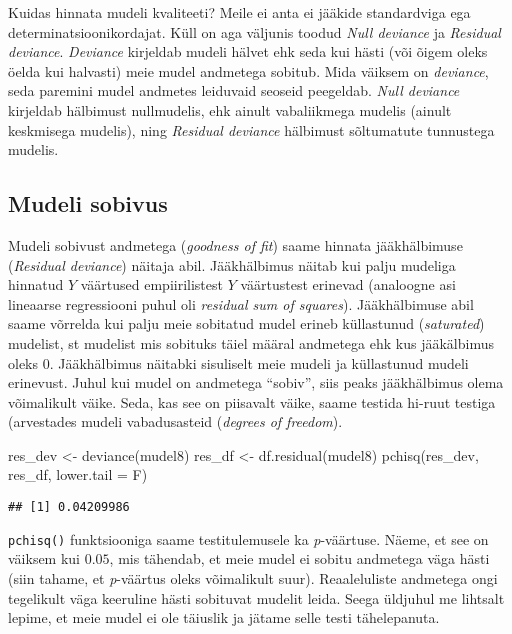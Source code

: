 \documentclass[
]{book}
\newenvironment{Shaded}{\begin{snugshade}}{\end{snugshade}}
\newcommand{\AttributeTok}[1]{\textcolor[rgb]{0.77,0.63,0.00}{#1}}
\newcommand{\FunctionTok}[1]{\textcolor[rgb]{0.00,0.00,0.00}{#1}}
\newcommand{\NormalTok}[1]{#1}
\newcommand{\OtherTok}[1]{\textcolor[rgb]{0.56,0.35,0.01}{#1}}
\begin{document}
Kuidas hinnata mudeli kvaliteeti? Meile ei anta ei jääkide standardviga ega determinatsioonikordajat. Küll on aga väljunis toodud \emph{Null deviance} ja \emph{Residual deviance}. \emph{Deviance} kirjeldab mudeli hälvet ehk seda kui hästi (või õigem oleks öelda kui halvasti) meie mudel andmetega sobitub. Mida väiksem on \emph{deviance}, seda paremini mudel andmetes leiduvaid seoseid peegeldab. \emph{Null deviance} kirjeldab hälbimust nullmudelis, ehk ainult vabaliikmega mudelis (ainult keskmisega mudelis), ning \emph{Residual deviance} hälbimust sõltumatute tunnustega mudelis.

\hypertarget{mudeli-sobivus}{%
\subsection{Mudeli sobivus}\label{mudeli-sobivus}}

Mudeli sobivust andmetega (\emph{goodness of fit}) saame hinnata jääkhälbimuse (\emph{Residual deviance}) näitaja abil. Jääkhälbimus näitab kui palju mudeliga hinnatud \(Y\) väärtused empiirilistest \(Y\) väärtustest erinevad (analoogne asi lineaarse regressiooni puhul oli \emph{residual sum of squares}). Jääkhälbimuse abil saame võrrelda kui palju meie sobitatud mudel erineb küllastunud (\emph{saturated}) mudelist, st mudelist mis sobituks täiel määral andmetega ehk kus jääkälbimus oleks \(0\). Jääkhälbimus näitabki sisuliselt meie mudeli ja küllastunud mudeli erinevust. Juhul kui mudel on andmetega ``sobiv'', siis peaks jääkhälbimus olema võimalikult väike. Seda, kas see on piisavalt väike, saame testida hi-ruut testiga (arvestades mudeli vabadusasteid (\emph{degrees of freedom}).

\begin{Shaded}
\begin{Highlighting}[]
\NormalTok{res\_dev }\OtherTok{\textless{}{-}} \FunctionTok{deviance}\NormalTok{(mudel8)}
\NormalTok{res\_df }\OtherTok{\textless{}{-}} \FunctionTok{df.residual}\NormalTok{(mudel8)}
\FunctionTok{pchisq}\NormalTok{(res\_dev, res\_df, }\AttributeTok{lower.tail =}\NormalTok{ F)}
\end{Highlighting}
\end{Shaded}

\begin{verbatim}
## [1] 0.04209986
\end{verbatim}

\texttt{pchisq()} funktsiooniga saame testitulemusele ka \emph{p}-väärtuse. Näeme, et see on väiksem kui \(0.05\), mis tähendab, et meie mudel ei sobitu andmetega väga hästi (siin tahame, et \emph{p}-väärtus oleks võimalikult suur). Reaaleluliste andmetega ongi tegelikult väga keeruline hästi sobituvat mudelit leida. Seega üldjuhul me lihtsalt lepime, et meie mudel ei ole täiuslik ja jätame selle testi tähelepanuta.
\end{document}
